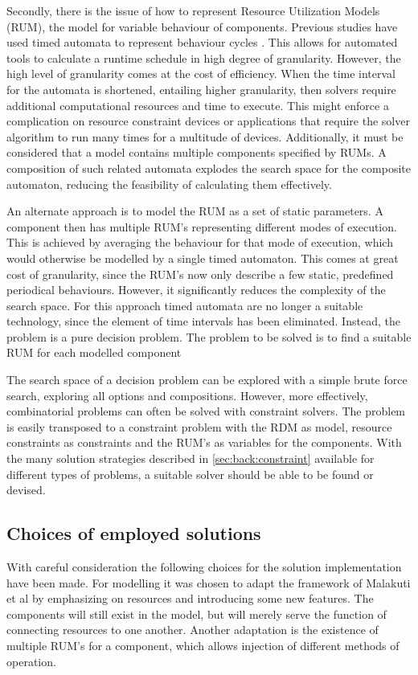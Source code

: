 Secondly, there is the issue of how to represent Resource Utilization Models (RUM), the model for variable behaviour of components. Previous studies have used timed automata to represent behaviour cycles \cite{rum_basis_89, steven_te_brinke}. This allows for automated tools to calculate a runtime schedule in high degree of granularity. However, the high level of granularity comes at the cost of efficiency. When the time interval for the automata is shortened, entailing higher granularity, then solvers require additional computational resources and time to execute. This might enforce a complication on resource constraint devices or applications that require the solver algorithm to run many times for a multitude of devices. Additionally, it must be considered that a model contains multiple components specified by RUMs. A composition of such related automata explodes the search space for the composite automaton, reducing the feasibility of calculating them effectively.

An alternate approach is to model the RUM as a set of static parameters. A component then has multiple RUM's representing different modes of execution. This is achieved by averaging the behaviour for that mode of execution, which would otherwise be modelled by a single timed automaton. This comes at great cost of granularity, since the RUM's now only describe a few static, predefined periodical behaviours. However, it significantly reduces the complexity of the search space. For this approach timed automata are no longer a suitable technology, since the element of time intervals has been eliminated. Instead, the problem is a pure decision problem. The problem to be solved is to find a suitable RUM for each modelled component

The search space of a decision problem can be explored with a simple brute force search, exploring all options and compositions. However, more effectively, combinatorial problems can often be solved with constraint solvers. The problem is easily transposed to a constraint problem with the RDM as model, resource constraints as constraints and the RUM's as variables for the components. With the many solution strategies described in \ref{sec:back:constraint} available for different types of problems, a suitable solver should be able to be found or devised.

\subsection{Choices of employed solutions}
\label{sub:choices}
With careful consideration the following choices for the solution implementation have been made. For modelling it was chosen to adapt the framework of Malakuti et al \cite{steven_te_brinke} by emphasizing on resources and introducing some new features. The components will still exist in the model, but will merely serve the function of connecting resources to one another. Another adaptation is the existence of multiple RUM's for a component, which allows injection of different methods of operation.

